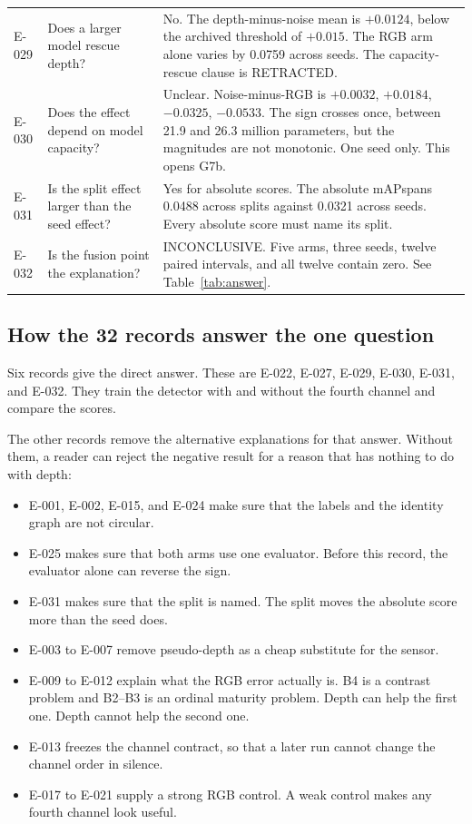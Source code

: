 \documentclass[preprint,12pt]{elsarticle}
\newcommand{\E}[1]{E-#1}
\newcommand{\G}[1]{G#1}
\newcommand{\mAP}{mAP}
\begin{document}
\begin{longtable}{L{0.07\textwidth}L{0.28\textwidth}L{0.55\textwidth}}
\E{029} & Does a larger model rescue depth? & No. The depth-minus-noise mean is
$+0.0124$, below the archived threshold of $+0.015$. The RGB arm alone varies by
0.0759 across seeds. The capacity-rescue clause is RETRACTED.\\

\E{030} & Does the effect depend on model capacity? & Unclear. Noise-minus-RGB
is $+0.0032$, $+0.0184$, $-0.0325$, $-0.0533$. The sign crosses once, between
21.9 and 26.3 million parameters, but the magnitudes are not monotonic. One seed
only. This opens \G{7b}.\\

\E{031} & Is the split effect larger than the seed effect? & Yes for absolute
scores. The absolute \mAP spans 0.0488 across splits against 0.0321 across
seeds. Every absolute score must name its split.\\

\E{032} & Is the fusion point the explanation? & INCONCLUSIVE. Five arms, three
seeds, twelve paired intervals, and all twelve contain zero. See
Table~\ref{tab:answer}.\\
\end{longtable}

\subsection{How the 32 records answer the one question}

Six records give the direct answer. These are \E{022}, \E{027}, \E{029},
\E{030}, \E{031}, and \E{032}. They train the detector with and without the
fourth channel and compare the scores.

The other records remove the alternative explanations for that answer. Without
them, a reader can reject the negative result for a reason that has nothing to
do with depth:

\begin{itemize}
\item \E{001}, \E{002}, \E{015}, and \E{024} make sure that the labels and the
identity graph are not circular.
\item \E{025} makes sure that both arms use one evaluator. Before this record,
the evaluator alone can reverse the sign.
\item \E{031} makes sure that the split is named. The split moves the absolute
score more than the seed does.
\item \E{003} to \E{007} remove pseudo-depth as a cheap substitute for the
sensor.
\item \E{009} to \E{012} explain what the RGB error actually is. B4 is a
contrast problem and B2--B3 is an ordinal maturity problem. Depth can help the
first one. Depth cannot help the second one.
\item \E{013} freezes the channel contract, so that a later run cannot change
the channel order in silence.
\item \E{017} to \E{021} supply a strong RGB control. A weak control makes any
fourth channel look useful.
\end{itemize}
\end{document}
